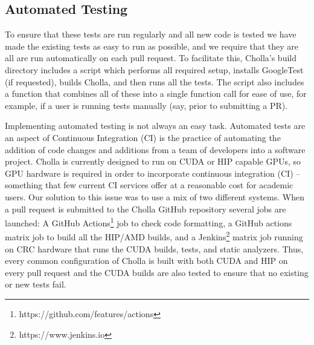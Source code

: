 \subsection{Automated Testing}

To ensure that these tests are run regularly and all new code is tested we have made the existing tests as easy to run as possible, and we require that they are all are run automatically on each pull request. To facilitate this, Cholla's build directory includes a script which performs all required setup, installs GoogleTest (if requested), builds Cholla, and then runs all the tests. The script also includes a function that combines all of these into a single function call for ease of use, for example, if a user is running tests manually (say, prior to submitting a PR). 

Implementing automated testing is not always an easy task. Automated tests are an aspect of Continuous Integration (CI) is the practice of automating the addition of code changes and additions from a team of developers into a software project. Cholla is currently designed to run on CUDA or HIP capable GPUs, so GPU hardware is required in order to incorporate continuous integration (CI) -- something that few current CI services offer at a reasonable cost for academic users. Our solution to this issue was to use a mix of two different systems. When a pull request is submitted to the Cholla GitHub repository several jobs are launched: A GitHub Actions\footnote{https://github.com/features/actions} job to check code formatting, a GitHub actions matrix job to build all the HIP/AMD builds, and a Jenkins\footnote{https://www.jenkins.io} matrix job running on CRC hardware that runs the CUDA builds, tests, and static analyzers. Thus, every common configuration of Cholla is built with both CUDA and HIP on every pull request and the CUDA builds are also tested to ensure that no existing or new tests fail. 



